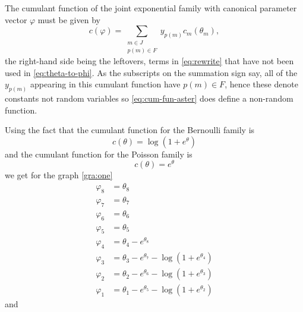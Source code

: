 \documentclass[11pt]{article}
\begin{document}
The cumulant function of the joint exponential family with canonical
parameter vector $\varphi$ must be given by
\begin{equation} \label{eq:cum-fun-aster}
   c(\varphi) =
   \sum_{\substack{m \in J \\ p(m) \in F}} y_{p(m)} c_m(\theta_m),
\end{equation}
the right-hand side being the leftovers, terms in \eqref{eq:rewrite} that
have not been used in \eqref{eq:theta-to-phi}.
As the subscripts on the summation sign
say, all of the $y_{p(m)}$ appearing in this cumulant function have
$p(m) \in F$, hence these denote constants not random variables so
\eqref{eq:cum-fun-aster} does define a non-random function.

Using the fact that the cumulant function for the Bernoulli family is
$$
   c(\theta) = \log(1 + e^\theta)
$$
and the cumulant function for the Poisson family is
$$
   c(\theta) = e^\theta
$$
we get for the graph \eqref{gra:one}
\begin{equation} \label{eq:big-theta-to-phi}
\begin{split}
   \varphi_8 & = \theta_8 \\
   \varphi_7 & = \theta_7 \\
   \varphi_6 & = \theta_6 \\
   \varphi_5 & = \theta_5 \\
   \varphi_4 & = \theta_4 - e^{\theta_8} \\
   \varphi_3 & = \theta_3 - e^{\theta_7} - \log(1 + e^{\theta_4}) \\
   \varphi_2 & = \theta_2 - e^{\theta_6} - \log(1 + e^{\theta_3}) \\
   \varphi_1 & = \theta_1 - e^{\theta_5} - \log(1 + e^{\theta_2})
\end{split}
\end{equation}
and
\end{document}
